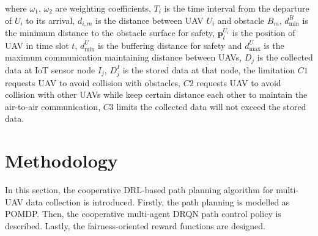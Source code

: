 \documentclass[journal]{IEEEtran}
\begin{document}
where $\omega_1$, $\omega_2$ are weighting coefficients, $T_i$ is the time interval from the departure of $U_i$ to its arrival, $d_{i,m}$ is the distance between UAV $U_i$ and obstacle $B_m$, $d_{\min}^{B}$ is the minimum distance to the obstacle surface for safety, $\mathbf{p}^{U_i}_t$ is the position of UAV in time slot $t$, $d^{U}_{\min}$ is the buffering distance for safety and $d^{U}_{\max}$ is the maximum communication maintaining distance between UAVs, $D_j$ is the collected data at IoT sensor node $I_j$, $D^I_j$ is the stored data at that node, the limitation $C1$ requests UAV to avoid collision with obstacles, $C2$ requests UAV to avoid collision with other UAVs while keep certain distance each other to maintain the air-to-air communication, $C3$ limits the collected data will not exceed the stored data. 

%
\section{Methodology}\label{Method}
In this section, the cooperative DRL-based path planning algorithm for multi-UAV data collection is introduced. Firstly, the path planning is modelled as POMDP. Then, the cooperative multi-agent DRQN path control policy is described. Lastly, the fairness-oriented reward functions are designed. 
\end{document}
